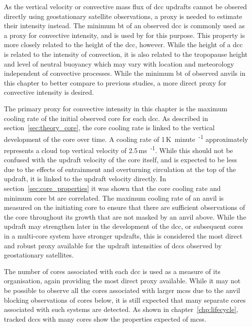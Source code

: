 As the vertical velocity or convective mass flux of \acrshort{dcc} updrafts cannot be obsered directly using geostationary satellite observations, a proxy is needed to estimate their intensity instead.
The minimum \acrshort{bt} of an observed \acrshort{dcc} is commonly used as a proxy for convective intensity, and is used by \citet{protopapadaki_upper_2017} for this purpose.
This property is more closely related to the height of the \acrshort{dcc}, however.
While the height of a \acrshort{dcc} is related to the intensity of convection, it is also related to the tropopause height and level of neutral buoyancy which may vary with location and meteorology independent of convective processes.
While the minimum \acrshort{bt} of observed anvils in this chapter to better compare to previous studies, a more direct proxy for convective intensity is desired.

The primary proxy for convective intensity in this chapter is the maximum cooling rate of the initial observed core for each \acrshort{dcc}.
As described in section~\ref{sec:theory_core}, the core cooling rate is linked to the vertical development of the core over time.
A cooling rate of 1\,\unit{K minute\textsuperscript{-1}} approximately represents a cloud top vertical velocity of 2.5\,\unit{ms\textsuperscript{-1}}.
While this should not be confused with the updraft velocity of the core itself, and is expected to be less due to the effects of entrainment and overturning circulation at the top of the updraft, it is linked to the updraft velocity directly.
In section~\ref{sec:core_properties} it was shown that the core cooling rate and minimum core \acrshort{bt} are correlated.
The maximum cooling rate of an anvil is measured on the initiating core to ensure that there are sufficient observations of the core throughout its growth that are not masked by an anvil above.
While the updraft may strengthen later in the development of the \acrshort{dcc}, or subsequent cores in a multi-core system have stronger updrafts, this is considered the most direct and robust proxy available for the updraft intensities of \acrshort{dcc}s observed by geostationary satellites.

The number of cores associated with each \acrshort{dcc} is used as a measure of its organisation, again providing the most direct proxy available.
While it may not be possible to observe all the cores associated with larger \acrshort{mcs}s due to the anvil blocking observations of cores below, it is still expected that many separate cores associated with such systems are detected.
As shown in chapter~\ref{chp:lifecycle}, tracked \acrshort{dcc}s with many cores show the properties expected of \acrshort{mcs}s.


